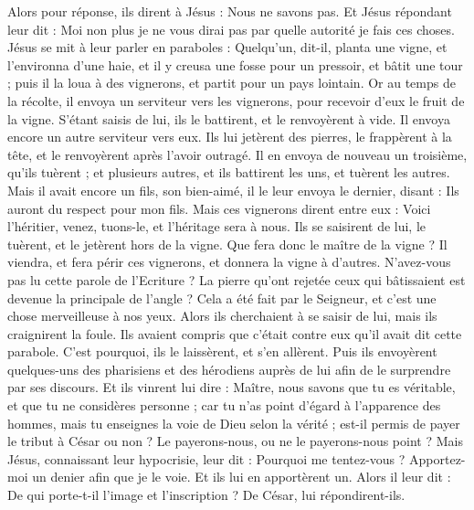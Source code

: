\begin{multicols}{2}
Alors pour réponse, ils dirent à Jésus : Nous ne savons pas. Et Jésus répondant leur dit : Moi non plus je ne vous dirai pas par quelle autorité je fais ces choses.
\VerseOne{}Jésus se mit à leur parler en paraboles : Quelqu'un, dit-il, planta une vigne, et l'environna d'une haie, et il y creusa une fosse pour un pressoir, et bâtit une tour ; puis il la loua à des vignerons, et partit pour un pays lointain.
Or au temps de la récolte, il envoya un serviteur vers les vignerons, pour recevoir d'eux le fruit de la vigne.
S'étant saisis de lui, ils le battirent, et le renvoyèrent à vide.
Il envoya encore un autre serviteur vers eux. Ils lui jetèrent des pierres, le frappèrent à la tête, et le renvoyèrent après l'avoir outragé.
Il en envoya de nouveau un troisième, qu'ils tuèrent ; et plusieurs autres, et ils battirent les uns, et tuèrent les autres.
Mais il avait encore un fils, son bien-aimé, il le leur envoya le dernier, disant : Ils auront du respect pour mon fils.
Mais ces vignerons dirent entre eux : Voici l'héritier, venez, tuons-le, et l'héritage sera à nous.
Ils se saisirent de lui, le tuèrent, et le jetèrent hors de la vigne.
Que fera donc le maître de la vigne ? Il viendra, et fera périr ces vignerons, et donnera la vigne à d'autres.
N'avez-vous pas lu cette parole de l'Ecriture ? La pierre qu'ont rejetée ceux qui bâtissaient est devenue la principale de l'angle ?
Cela a été fait par le Seigneur, et c'est une chose merveilleuse à nos yeux.
Alors ils cherchaient à se saisir de lui, mais ils craignirent la foule. Ils avaient compris que c'était contre eux qu'il avait dit cette parabole. C'est pourquoi, ils le laissèrent, et s'en allèrent.
Puis ils envoyèrent quelques-uns des pharisiens et des hérodiens auprès de lui afin de le surprendre par ses discours.
Et ils vinrent lui dire : Maître, nous savons que tu es véritable, et que tu ne considères personne ; car tu n'as point d'égard à l'apparence des hommes, mais tu enseignes la voie de Dieu selon la vérité ; est-il permis de payer le tribut à César ou non ? Le payerons-nous, ou ne le payerons-nous point ?
Mais Jésus, connaissant leur hypocrisie, leur dit : Pourquoi me tentez-vous ? Apportez-moi un denier afin que je le voie.
Et ils lui en apportèrent un. Alors il leur dit : De qui porte-t-il l'image et l'inscription ? De César, lui répondirent-ils.

\end{multicols}
